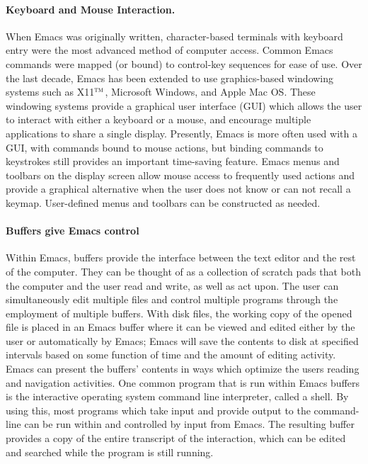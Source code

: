 \documentclass{article}
\newcommand*{\tm}{$^{\mbox{\scriptsize\sc tm}}$}
\begin{document}
\paragraph{Keyboard and Mouse Interaction.}
When Emacs was originally written, character-based terminals with
keyboard entry were the most advanced method of computer access.
Common Emacs commands were mapped (or bound) to control-key sequences
for ease of use.  Over the last decade, Emacs has been extended to use
graphics-based windowing systems such as X11\tm, Microsoft Windows,
and Apple Mac OS.  These windowing systems provide a graphical user
interface (GUI) which allows the user to interact with either a
keyboard or a mouse, and encourage multiple applications to share a
single display.  Presently, Emacs is more often used with a GUI, with
commands bound to mouse actions, but binding commands to keystrokes
still provides an important time-saving feature.  Emacs menus and
toolbars on the display screen allow mouse access to frequently used
actions and provide a graphical alternative when the user does not
know or can not recall a keymap.  User-defined menus and toolbars can
be constructed as needed.

\paragraph{Buffers give Emacs control}%
Within Emacs, buffers provide the interface between the text editor
and the rest of the computer.  They can be thought of as a collection
of scratch pads that both the computer and the user read and write, as
well as act upon.  The user can simultaneously edit multiple files and
control multiple programs through the employment of multiple buffers.
With disk files, the working copy of the opened file is placed in an
Emacs buffer where it can be viewed and edited either by the user or
automatically by Emacs; Emacs will save the contents to disk at
specified intervals based on some function of time and the amount of
editing activity.  Emacs can present the buffers' contents in ways
which optimize the users reading and navigation activities.  One
common program that is run within Emacs buffers is the interactive
operating system command line interpreter, called a shell.  By using
this, most programs which take input and provide output to the
command-line can be run within and controlled by input from Emacs.
The resulting buffer provides a copy of the entire transcript of the
interaction, which can be edited and searched while the program is
still running.  %
\end{document}
